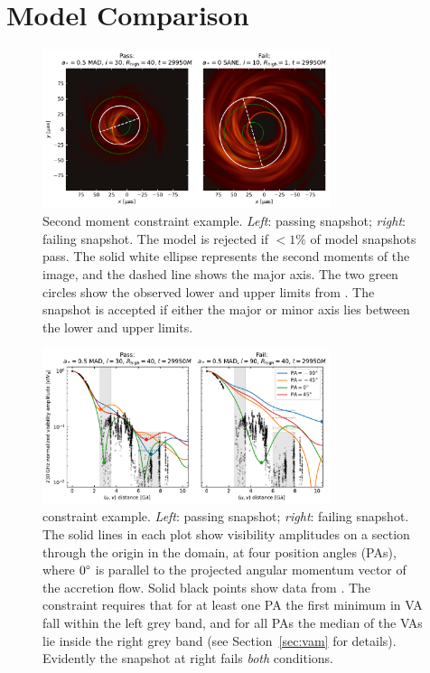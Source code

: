 \section{Model Comparison}\label{sec:comparisons}

\begin{figure}
  \centering
  \includegraphics[width=0.75\textwidth]{figures/passfail_sz.pdf}
  \caption{Second moment constraint example.
    \emph{Left}: passing snapshot;
    \emph{right}: failing snapshot.
    The model is rejected if $< 1\%$ of model snapshots pass.
    The solid white ellipse  represents the second moments of the image, and the dashed line shows the major axis.
    The two green circles show the observed lower and upper limits from .
    The snapshot is accepted if either the major or minor axis lies between the lower and upper limits.}
  \label{fig:passfail_sz}
\end{figure}

\begin{figure}
  \centering
  \includegraphics[width=0.75\textwidth]{figures/passfail_va.pdf}
  \caption{\vam constraint example.
    \emph{Left}: passing snapshot;
    \emph{right}: failing snapshot.
    The solid lines in each plot show visibility amplitudes on a section through the origin in the \uv domain, at four position angles (PAs), where $0\degree$ is parallel to the projected angular momentum vector of the accretion flow.
    Solid black points show data from \aprilvii.
    The \vam constraint requires that for at least one PA the first minimum in VA fall within the left grey band, and for all PAs the median of the VAs lie inside the right grey band (see Section~\ref{sec:vam} for details).
    Evidently the snapshot at right fails {\em both} conditions.}
  \label{fig:passfail_va}
\end{figure}

